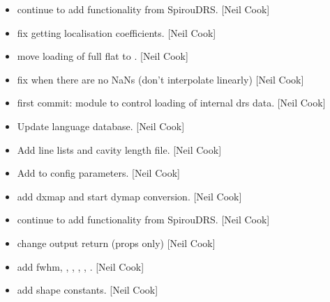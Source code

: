 \documentclass[a4paper,10pt,english]{report}
\begin{document}
\begin{itemize}
\item {} 
 \sphinxhyphen{} continue to add functionality from SpirouDRS.
{[}Neil Cook{]}

\item {} 
 \sphinxhyphen{} fix getting localisation coefficients.
{[}Neil Cook{]}

\item {} 
 \sphinxhyphen{} move loading of full flat to .
{[}Neil Cook{]}

\item {} 
 \sphinxhyphen{} fix when there are no NaNs (don’t interpolate
linearly) {[}Neil Cook{]}

\item {} 
 \sphinxhyphen{} first commit: module to control loading of internal drs
data. {[}Neil Cook{]}

\item {} 
Update language database. {[}Neil Cook{]}

\item {} 
Add line lists and cavity length file. {[}Neil Cook{]}

\item {} 
Add to config parameters. {[}Neil Cook{]}

\item {} 
 \sphinxhyphen{} add dxmap and start dymap conversion.
{[}Neil Cook{]}

\item {} 
 \sphinxhyphen{} continue to add functionality from SpirouDRS.
{[}Neil Cook{]}

\item {} 
 \sphinxhyphen{} change output return (props only) {[}Neil
Cook{]}

\item {} 
 \sphinxhyphen{} add fwhm, , ,
, , . {[}Neil Cook{]}

\item {} 
 \sphinxhyphen{} add shape constants. {[}Neil Cook{]}


\end{itemize}
\end{document}
